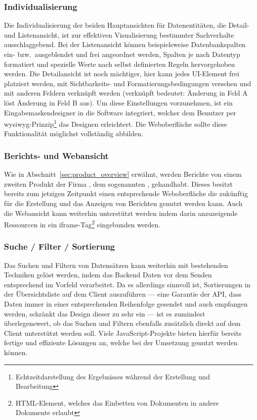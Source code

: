 \subsubsection{Individualisierung}
Die Individualisierung der beiden Hauptansichten für Datenentitäten, die Detail- und Listenansicht, ist zur effektiven Visualisierung bestimmter Sachverhalte ausschlaggebend. Bei der Listenansicht können beispielsweise Datenbankspalten ein- bzw.\ ausgeblendet und frei angeordnet werden, Spalten je nach Datentyp formatiert und spezielle Werte nach selbst definierten Regeln hervorgehoben werden. Die Detailansicht ist noch mächtiger, hier kann jedes UI-Element frei platziert werden, mit Sichtbarkeits- und Formatierungsbedingungen versehen und mit anderen Feldern verknüpft werden (verknüpft bedeutet: Änderung in Feld A löst Änderung in Feld B aus). Um diese Einstellungen vorzunehmen, ist ein Eingabemaskendesigner in die Software integriert, welcher dem Benutzer per \gls{wysiwyg}-Prinzip\footnote{Echtzeitdarstellung des Ergebnisses während der Erstellung und Bearbeitung} das Designen erleichtert.
Die Weboberfläche sollte diese Funktionalität möglichst vollständig abbilden.

\subsubsection{Berichts- und Webansicht}
Wie in Abschnitt~\ref{sec:product_overview} erwähnt, werden Berichte von einem zweiten Produkt der Firma , dem sogenannten , gehandhabt. Dieses besitzt bereits zum jetzigen Zeitpunkt einen entsprechende Weboberfläche die zukünftig für die Erstellung und das Anzeigen von Berichten genutzt werden kann. 
Auch die Webansicht kann weiterhin unterstützt werden indem darin anzuzeigende Ressourcen in ein iframe-Tag\footnote{HTML-Element, welches das Einbetten von Dokumenten in andere Dokumente erlaubt} eingebunden werden.

\subsubsection{Suche / Filter / Sortierung}
Das Suchen und Filtern von Datensätzen kann weiterhin mit bestehenden Techniken gelöst werden, indem das Backend Daten vor dem Senden entsprechend im Vorfeld verarbeitet. Da es allerdings sinnvoll ist, Sortierungen in der Übersichtsliste auf dem Client auszuführen --- eine Garantie der API, dass Daten immer in einer entsprechenden Reihenfolge gesendet und auch empfangen werden, schränkt das Design dieser zu sehr ein --- ist es zumindest überlegenswert, ob das Suchen und Filtern ebenfalls zusätzlich direkt auf dem Client unterstützt werden soll. Viele JavaScript-Projekte bieten hierfür bereits fertige und effiziente Lösungen an, welche bei der Umsetzung genutzt werden können.

